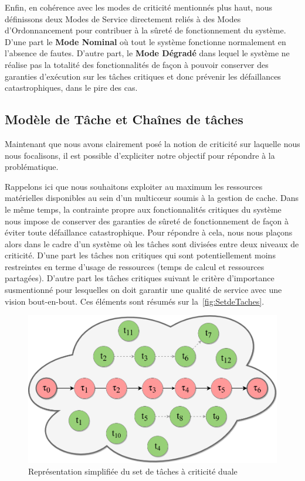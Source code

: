 \documentclass[french, a4paper, 11pt, twoside, pdftex]{StyleThese}
\begin{document}
    Enfin, en cohérence avec les modes de criticité mentionnés plus haut, nous définissons deux Modes de Service directement reliés à des Modes d'Ordonnancement pour contribuer à la sûreté de fonctionnement du système. D'une part le \textbf{Mode Nominal} où tout le système fonctionne normalement en l'absence de fautes. D'autre part, le \textbf{Mode Dégradé} dans lequel le système ne réalise pas la totalité des fonctionnalités de façon à pouvoir conserver des garanties d'exécution sur les tâches critiques et donc prévenir les défaillances catastrophiques, dans le pire des cas.
    

    \subsection{Modèle de Tâche et Chaînes de tâches}
    	Maintenant que nous avons clairement posé la notion de criticité sur laquelle nous nous focalisons, il est possible d'expliciter notre objectif pour répondre à la problématique.
    	
    	Rappelons ici que nous souhaitons exploiter au maximum les ressources matérielles disponibles au sein d'un multicœur soumis à la gestion de cache.
    	Dans le même temps, la contrainte propre aux fonctionnalités critiques du système nous impose de conserver des garanties de sûreté de fonctionnement de façon à éviter toute défaillance catastrophique.
    	Pour répondre à cela, nous nous plaçons alors dans le cadre d'un système où les tâches sont divisées entre deux niveaux de criticité. D'une part les tâches non critiques qui sont potentiellement moins restreintes en terme d'usage de ressources (temps de calcul et ressources partagées). D'autre part les tâches critiques suivant le critère d'importance susmentionné pour lesquelles on doit garantir une qualité de service avec une vision bout-en-bout. Ces éléments sont résumés sur la~\autoref{fig:SetdeTaches}.
    	
    	\begin{figure}[th]
    		\centering
    		\includegraphics[width=0.8\linewidth]{schemas/SetDeTaches}
    		\caption{Représentation simplifiée du set de tâches à criticité duale}
    		\label{fig:SetdeTaches}
    	\end{figure}
    	
\end{document}
